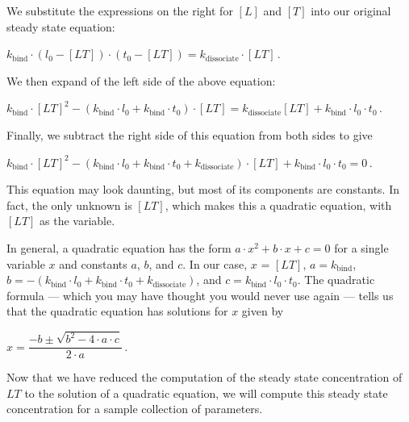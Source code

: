\noindent We substitute the expressions on the right for $[L]$ and $[T]$ into our original steady state equation:

\begin{center}
$k_\text{bind} \cdot (l_0 - [LT]) \cdot (t_0 - [LT]) = k_\text{dissociate} \cdot [LT]$\,.
\end{center}

\noindent We then expand of the left side of the above equation:

\begin{center}
$k_\text{bind} \cdot [LT]^2 - (k_\text{bind} \cdot l_0 + k_\text{bind} \cdot t_0) \cdot [LT]  = k_\text{dissociate} [LT] + k_\text{bind} \cdot l_0 \cdot t_0$\,.
\end{center}

\noindent Finally, we subtract the right side of this equation from both sides to give

\begin{center}
$k_\text{bind} \cdot [LT]^2 - (k_\text{bind} \cdot l_0 + k_\text{bind} \cdot t_0 + k_\text{dissociate}) \cdot [LT] + k_\text{bind} \cdot l_0 \cdot t_0 = 0$\,.
\end{center}

\noindent This equation may look daunting, but most of its components are constants. In fact, the only unknown is $[LT]$, which makes this a quadratic equation, with $[LT]$ as the variable.

In general, a quadratic equation has the form $a \cdot x^2 + b \cdot x + c = 0$ for a single variable $x$ and constants $a$, $b$, and $c$. In our case, $x$ = $[LT]$, $a = k_\text{bind}$, $b = - (k_\text{bind} \cdot l_0 + k_\text{bind} \cdot t_0 + k_\text{dissociate})$, and $c = k_\text{bind} \cdot l_0 \cdot t_0$. The quadratic formula --- which you may have thought you would never use again --- tells us that the quadratic equation has solutions for $x$ given by

\begin{center}
$x = \dfrac{-b \pm \sqrt{b^2 - 4 \cdot a \cdot c}}{2 \cdot a}$\,.
\end{center}

\fudgespace

\begin{qbox}\end{qbox}

Now that we have reduced the computation of the steady state concentration of $LT$ to the solution of a quadratic equation, we will compute this steady state concentration for a sample collection of parameters.

